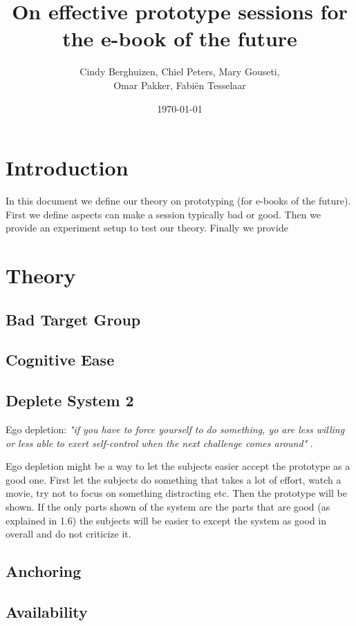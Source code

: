 \documentclass{article}
\title{On effective prototype sessions for the e-book of the future}
\author{Cindy Berghuizen, Chiel Peters, Mary Gouseti,\\ Omar Pakker, Fabi\"en Tesselaar}
\date{\today}
\begin{document}
\maketitle

\tableofcontents

\section{Introduction}

In this document we define our theory on prototyping (for e-books of the future).
First we define aspects can make a session typically bad or good. 
Then we provide an experiment setup to test our theory. Finally we provide 

\section{Theory}

\subsection{Bad Target Group}
\subsection{Cognitive Ease}

\subsection{ Deplete System 2}
Ego depletion:\emph{ "if you have to force yourself to do something, yo are less willing
or less able to exert self-control when the next challenge comes around" }.

Ego depletion might be a way to let the subjects easier accept the prototype
as a good one. First let the subjects do something that takes a lot of effort, watch
a movie, try not to focus on something distracting etc. Then the prototype will
be shown. If the only parts shown of the system are the parts that are good
(as explained in 1.6) the subjects will be easier to except the system as good in
overall and do not criticize it.

\subsection{Anchoring}
\subsection{Availability}
\end{document}
